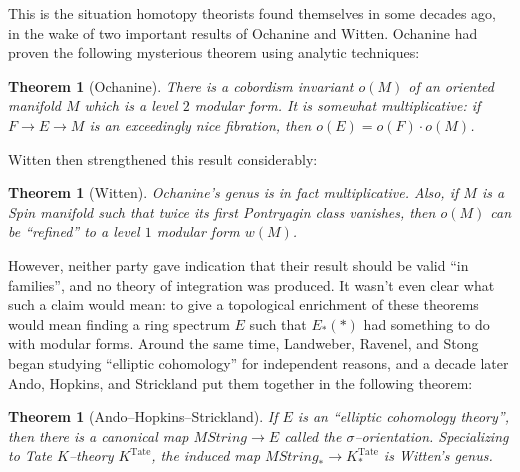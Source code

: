 \documentclass{amsart}
\newcommand{\<}{\langle}
\renewcommand{\>}{\rangle}
\newcommand{\String}{\mathit{String}}
\newcommand{\Tate}{\mathrm{Tate}}
\numberwithin{equation}{section}
\theoremstyle{plain}
\newtheorem{theorem}[equation]{Theorem}
\theoremstyle{definition}
\theoremstyle{remark}
\begin{document}
This is the situation homotopy theorists found themselves in some decades ago, in the wake of two important results of Ochanine and Witten. Ochanine had proven the following mysterious theorem using analytic techniques:

\begin{theorem}[Ochanine]
There is a cobordism invariant $o(M)$ of an oriented manifold $M$ which is a level $2$ modular form. It is somewhat multiplicative: if $F \to E \to M$ is an exceedingly nice fibration, then $o(E) = o(F) \cdot o(M)$.
\end{theorem}

\noindent Witten then strengthened this result considerably:

\begin{theorem}[Witten]
Ochanine's genus is in fact multiplicative. Also, if $M$ is a Spin manifold such that twice its first Pontryagin class vanishes, then $o(M)$ can be ``refined'' to a level $1$ modular form $w(M)$.
\end{theorem}

\noindent However, neither party gave indication that their result should be valid ``in families'', and no theory of integration was produced.  It wasn't even clear what such a claim would mean: to give a topological enrichment of these theorems would mean finding a ring spectrum $E$ such that $E_*(*)$ had something to do with modular forms.  Around the same time, Landweber, Ravenel, and Stong began studying ``elliptic cohomology'' for independent reasons, and a decade later Ando, Hopkins, and Strickland put them together in the following theorem:

\begin{theorem}[Ando--Hopkins--Strickland]
If $E$ is an ``elliptic cohomology theory'', then there is a canonical map $M\String \to E$ called the $\sigma$--orientation.  Specializing to Tate $K$--theory $K^{\Tate}$, the induced map $M\String_* \to K^{\Tate}_*$ is Witten's genus.
\end{theorem}
\end{document}
